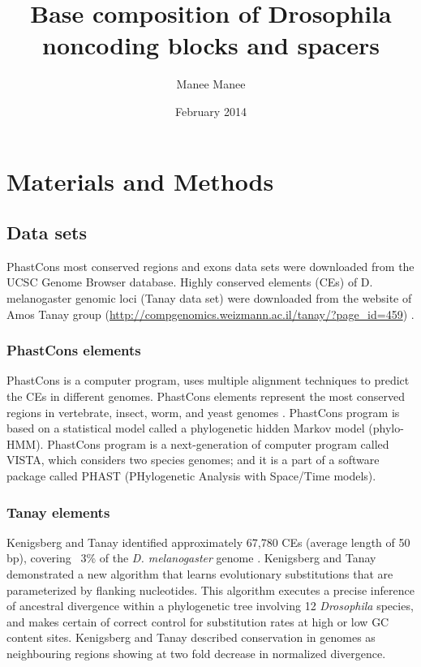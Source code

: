 \documentclass[12pt]{report}
\title{Base composition of Drosophila noncoding blocks and spacers}
\author{Manee Manee}
\date{February 2014}
\begin{document}
\pagestyle{plain} %
\maketitle
\onehalfspacing %


\section{Materials and Methods}
\subsection{Data sets}
PhastCons most conserved regions and exons data sets were downloaded from the UCSC Genome Browser database. Highly conserved elements (CEs) of D. melanogaster genomic loci (Tanay data set) were downloaded from the website of Amos Tanay group (\url{http://compgenomics.weizmann.ac.il/tanay/?page_id=459}) \citep{Tanay2013}.

\subsubsection{PhastCons elements}
PhastCons is a computer program, uses multiple alignment techniques to predict the CEs in different genomes. PhastCons elements represent the most conserved regions in vertebrate, insect, worm, and yeast genomes \citep{Siepel2005}. PhastCons program is based on a statistical model called a phylogenetic hidden Markov model (phylo-HMM). PhastCons program is a next-generation of computer program called VISTA, which considers two species genomes; and it is a part of a software package called PHAST (PHylogenetic Analysis with Space/Time models).

\subsubsection{Tanay elements}
Kenigsberg and Tanay identified approximately 67,780 CEs (average length of 50 bp), covering ~3\% of the \textit{D. melanogaster} genome \citep{Tanay2013}. Kenigsberg and Tanay demonstrated a new algorithm that learns evolutionary substitutions that are parameterized by flanking nucleotides. This algorithm executes a precise inference of ancestral divergence within a phylogenetic tree involving 12 \textit{Drosophila} species, and makes certain of correct control for substitution rates at high or low GC content sites. Kenigsberg and Tanay described conservation in genomes as neighbouring regions showing at two fold decrease in normalized divergence. 
\end{document}
